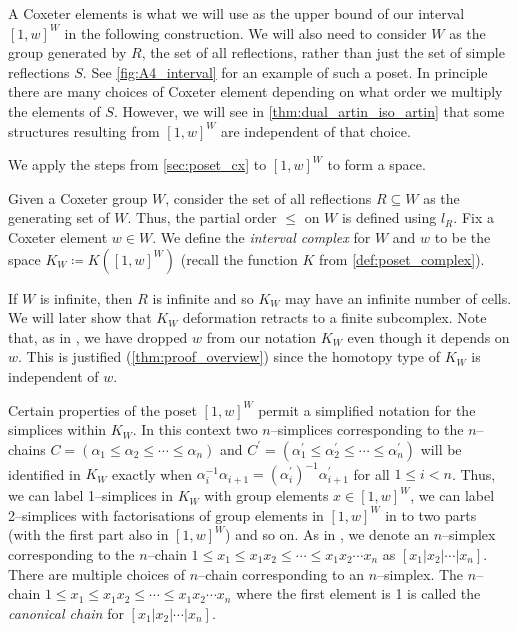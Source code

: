\documentclass[class=article, crop=false]{standalone}
\begin{document}
A Coxeter elements is what we will use as the upper bound of our interval $[1,w]^W$ in the following construction. We will also need to consider $W$ as the group generated by $R$, the set of all reflections, rather than just the set of simple reflections $S$. See \cref{fig:A4_interval} for an example of such a poset. In principle there are many choices of Coxeter element depending on what order we multiply the elements of $S$. 
However, we will see in \cref{thm:dual_artin_iso_artin} that some structures resulting from $[1,w]^W$ are independent of that choice.

We apply the steps from \cref{sec:poset_cx} to $[1,w]^W$ to form a space.

\begin{definition}
    Given a Coxeter group $W$, consider the set of all reflections $R\subseteq W$ as the generating set of $W$. Thus, the partial order $\leq$ on $W$ is defined using $l_R$. Fix a Coxeter element $w \in W$. We define the \emph{interval complex} for $W$ and $w$ to be the space $K_{W} \coloneq K([1,w]^W)$ (recall the function $K$ from \cref{def:poset_complex}).
    \label{def:interval_complex}
\end{definition}

If $W$ is infinite, then $R$ is infinite and so $K_W$ may have an infinite number of cells. We will later show that $K_W$ deformation retracts to a finite subcomplex. Note that, as in \cite{paolini_salvetti_kpi1_2021}, we have dropped $w$ from our notation $K_{W}$ even though it depends on $w$. This is justified (\cref{thm:proof_overview}) since the homotopy type of $K_W$ is independent of $w$.

Certain properties of the poset $[1,w]^W$ permit a simplified notation for the simplices within $K_{W}$. In this context two $n$--simplices corresponding to the $n$--chains $C=(\alpha_1 \leq \alpha_2 \leq \cdots \leq \alpha_n)$ and $C^\prime = (\alpha_1^\prime \leq \alpha_2^\prime \leq \cdots \leq \alpha_n^\prime)$ will be identified in $K_W$ exactly when $\alpha_i^{-1}\alpha_{i+1} = (\alpha^\prime_i)^{-1}\alpha^\prime_{i+1}$ for all $1\leq i <n$. Thus, we can label 1--simplices in $K_{W}$ with group elements $x \in [1,w]^W$, we can label 2--simplices with factorisations of group elements in $[1,w]^W$ in to two parts (with the first part also in $[1,w]^W$) and so on.
As in \cite[Definition 2.8]{paolini_salvetti_kpi1_2021}, we denote an $n$--simplex corresponding to the $n$--chain $1 \leq x_1 \leq x_1x_2 \leq \cdots \leq x_1x_2\cdots x_n$ as $[x_1 | x_2 | \cdots | x_n]$. There are multiple choices of $n$--chain corresponding to an $n$--simplex.
The $n$--chain $1 \leq x_1 \leq x_1x_2 \leq \cdots \leq x_1x_2\cdots x_n$ where the first element is 1 is called the \emph{canonical chain} for $[x_1 | x_2 | \cdots | x_n]$. 
\end{document}
